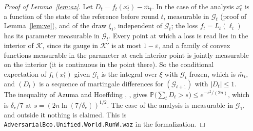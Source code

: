 \documentclass[11pt]{amsart}
\theoremstyle{definition}
\numberwithin{equation}{section}
\newcommand{\Prob}{\mathbb{P}}
\newcommand{\cK}{\mathcal{K}}
\newcommand{\cG}{\mathscr{G}}
\begin{document}
\begin{proof}[Proof of Lemma~\ref{lem:az}]
Let $D_t=f_t(x^\circ_t)-\bar m_t$. In the case of the analysis $x^\circ_t$ is a function of the state of the reference before round $t$, measurable in $\cG_t$ (proof of Lemma~\ref{lem:ve}), and of the draw $\xi_t$, independent of $\cG_t$; the loss $f_t=L_t(\ell_t)$ has its parameter measurable in $\cG_t$. Every point at which a loss is read lies in the interior of $\cK$, since its gauge in $\cK'$ is at most $1-\varepsilon$, and a family of convex functions measurable in the parameter at each interior point is jointly measurable on the interior (it is continuous in the point there). So the conditional expectation of $f_t(x^\circ_t)$ given $\cG_t$ is the integral over $\xi$ with $\cG_t$ frozen, which is $\bar m_t$, and $(D_t)$ is a sequence of martingale differences for $(\cG_{t+1})$ with $|D_t|\le1$. The inequality of Azuma and Hoeffding \cite{Azuma67}, \cite[Theorem~B.19]{Lat24}, gives $\Prob\bigl(\sum_tD_t>s\bigr)\le e^{-s^2/(2n)}$, which is $\delta_e/7$ at $s=(2n\ln(7/\delta_e))^{1/2}$. The case of the analysis is measurable in $\cG_1$, and outside it nothing is claimed.
This is \texttt{AdversarialBco.Unified.World.RunW.waz} in the formalization.
\end{proof}
\end{document}
